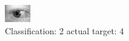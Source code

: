 \begin{figure}[h!]
\begin{center}
\includegraphics[width=0.60\columnwidth]{figures/ID838_class_2_target_4.png}
\end{center}
\caption{ Classification: 2 actual target: 4}
\label{fig:ID838_class_2_target_4}
\end{figure}
